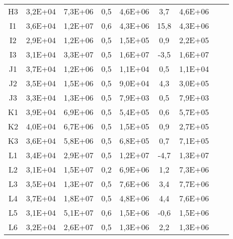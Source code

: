 \begin{center}
\begin{longtable}{ccccccccc}
H3    & 3,2E+04 & 7,3E+06 & 0,5   & 4,6E+06 & 3,7   & 4,6E+06 \\
I1    & 3,6E+04 & 1,2E+07 & 0,6   & 4,3E+06 & 15,8  & 4,3E+06 \\
I2    & 2,9E+04 & 1,2E+06 & 0,5   & 1,5E+05 & 0,9   & 2,2E+05 \\
I3    & 3,1E+04 & 3,3E+07 & 0,5   & 1,6E+07 & -3,5  & 1,6E+07 \\
J1    & 3,7E+04 & 1,2E+06 & 0,5   & 1,1E+04 & 0,5   & 1,1E+04 \\
J2    & 3,5E+04 & 1,5E+06 & 0,5   & 9,0E+04 & 4,3   & 3,0E+05 \\
J3    & 3,3E+04 & 1,3E+06 & 0,5   & 7,9E+03 & 0,5   & 7,9E+03 \\
K1    & 3,9E+04 & 6,9E+06 & 0,5   & 5,4E+05 & 0,6   & 5,7E+05 \\
K2    & 4,0E+04 & 6,7E+06 & 0,5   & 1,5E+05 & 0,9   & 2,7E+05 \\
K3    & 3,6E+04 & 5,8E+06 & 0,5   & 6,8E+05 & 0,7   & 7,1E+05 \\
L1    & 3,4E+04 & 2,9E+07 & 0,5   & 1,2E+07 & -4,7  & 1,3E+07 \\
L2    & 3,1E+04 & 1,5E+07 & 0,2   & 6,9E+06 & 1,2   & 7,3E+06 \\
L3    & 3,5E+04 & 1,3E+07 & 0,5   & 7,6E+06 & 3,4   & 7,7E+06 \\
L4    & 3,7E+04 & 1,8E+07 & 0,5   & 4,8E+06 & 4,4   & 7,6E+06 \\
L5    & 3,1E+04 & 5,1E+07 & 0,6   & 1,5E+06 & -0,6  & 1,5E+06 \\
L6    & 3,2E+04 & 2,6E+07 & 0,5   & 1,3E+06 & 2,2   & 1,3E+06 \\
\end{longtable}
\end{center}

